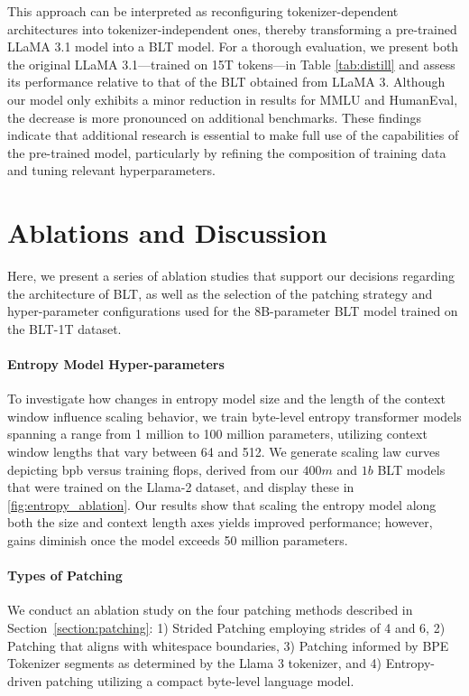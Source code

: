 This approach can be interpreted as reconfiguring tokenizer-dependent architectures into tokenizer-independent ones, thereby transforming a pre-trained LLaMA 3.1 model into a {\textsc BLT} model. For a thorough evaluation, we present both the original LLaMA 3.1—trained on 15T tokens—in Table \ref{tab:distill} and assess its performance relative to that of the {\textsc BLT} obtained from LLaMA 3. Although our model only exhibits a minor reduction in results for MMLU and HumanEval, the decrease is more pronounced on additional benchmarks. These findings indicate that additional research is essential to make full use of the capabilities of the pre-trained model, particularly by refining the composition of training data and tuning relevant hyperparameters.

\section{Ablations and Discussion}
\label{section:ablations}
Here, we present a series of ablation studies that support our decisions regarding the architecture of {\textsc BLT}, as well as the selection of the patching strategy and hyper-parameter configurations used for the 8B-parameter {\textsc BLT} model trained on the {\textsc BLT}-1T dataset.

\paragraph{Entropy Model Hyper-parameters} To investigate how changes in entropy model size and the length of the context window influence scaling behavior, we train byte-level entropy transformer models spanning a range from 1 million to 100 million parameters, utilizing context window lengths that vary between 64 and 512. We generate scaling law curves depicting bpb versus training flops, derived from our $400m$ and $1b$ {\textsc BLT} models that were trained on the Llama-2 dataset, and display these in \autoref{fig:entropy_ablation}. Our results show that scaling the entropy model along both the size and context length axes yields improved performance; however, gains diminish once the model exceeds 50 million parameters.

\paragraph{Types of Patching}

We conduct an ablation study on the four patching methods described in Section~\ref{section:patching}: 1) Strided Patching employing strides of 4 and 6, 2) Patching that aligns with whitespace boundaries, 3) Patching informed by BPE Tokenizer segments as determined by the Llama 3 tokenizer, and 4) Entropy-driven patching utilizing a compact byte-level language model.

